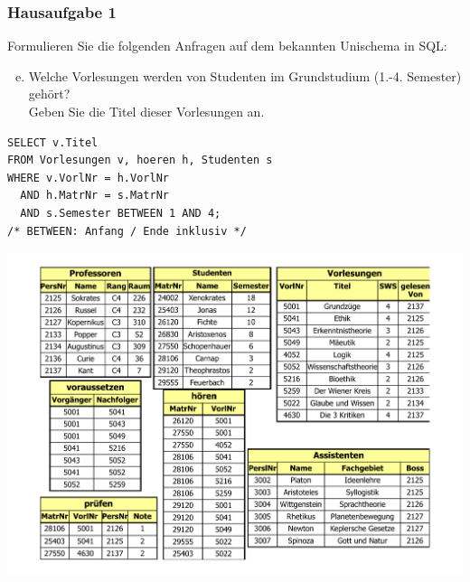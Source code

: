 \begin{frame}[fragile]
	\frametitle{Hausaufgabe 1}
	\vspace{0.5cm}

	\begin{multicols}{2}
		Formulieren Sie die folgenden Anfragen auf dem bekannten Unischema in SQL:
		\begin{enumerate}[a)]
			\setcounter{enumi}{4}
			\item Welche Vorlesungen werden von Studenten im Grundstudium (1.-4. Semester) gehört? \\
			      Geben Sie die Titel dieser Vorlesungen an.
		\end{enumerate}
		\begin{verbatim}
SELECT v.Titel
FROM Vorlesungen v, hoeren h, Studenten s
WHERE v.VorlNr = h.VorlNr
  AND h.MatrNr = s.MatrNr
  AND s.Semester BETWEEN 1 AND 4;
/* BETWEEN: Anfang / Ende inklusiv */
		\end{verbatim}
		\vfill\columnbreak

		\begin{center}
			\includegraphics[height=.6\paperheight]{../img/uni.pdf}
		\end{center}
	\end{multicols}
\end{frame}

